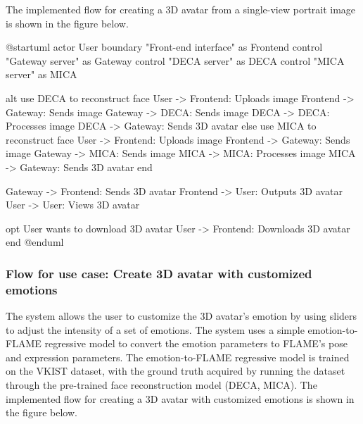 The implemented flow for creating a 3D avatar from a single-view portrait image is shown in the figure below.

\begin{umlfigure}
    @startuml
    actor User
    boundary "Front-end interface" as Frontend
    control "Gateway server" as Gateway
    control "DECA server" as DECA
    control "MICA server" as MICA


    alt use DECA to reconstruct face
    User -> Frontend: Uploads image
    Frontend -> Gateway: Sends image
    Gateway -> DECA: Sends image
    DECA -> DECA: Processes image
    DECA -> Gateway: Sends 3D avatar
    else use MICA to reconstruct face
    User -> Frontend: Uploads image
    Frontend -> Gateway: Sends image
    Gateway -> MICA: Sends image
    MICA -> MICA: Processes image
    MICA -> Gateway: Sends 3D avatar
    end

    Gateway -> Frontend: Sends 3D avatar
    Frontend -> User: Outputs 3D avatar
    User -> User: Views 3D avatar

    opt User wants to download 3D avatar
    User -> Frontend: Downloads 3D avatar
    end
    @enduml
\end{umlfigure}

\clearpage

\subsubsection{Flow for use case: Create 3D avatar with customized emotions}
The system allows the user to customize the 3D avatar's emotion by using sliders to adjust the intensity of a set of emotions. The system uses a simple emotion-to-FLAME regressive model to convert the emotion parameters to FLAME's pose and expression parameters. The emotion-to-FLAME regressive model is trained on the VKIST dataset, with the ground truth acquired by running the dataset through the pre-trained face reconstruction model (DECA, MICA). The implemented flow for creating a 3D avatar with customized emotions is shown in the figure below.

\clearpage

